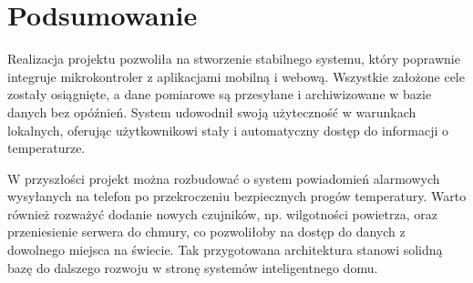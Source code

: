 \chapter*{Podsumowanie}

Realizacja projektu pozwoliła na stworzenie stabilnego systemu, który poprawnie integruje mikrokontroler z aplikacjami mobilną i webową. Wszystkie założone cele zostały osiągnięte, a dane pomiarowe są przesyłane i archiwizowane w bazie danych bez opóźnień. System udowodnił swoją użyteczność w warunkach lokalnych, oferując użytkownikowi stały i automatyczny dostęp do informacji o temperaturze.

W przyszłości projekt można rozbudować o system powiadomień alarmowych wysyłanych na telefon po przekroczeniu bezpiecznych progów temperatury. Warto również rozważyć dodanie nowych czujników, np. wilgotności powietrza, oraz przeniesienie serwera do chmury, co pozwoliłoby na dostęp do danych z dowolnego miejsca na świecie. Tak przygotowana architektura stanowi solidną bazę do dalszego rozwoju w stronę systemów inteligentnego domu.